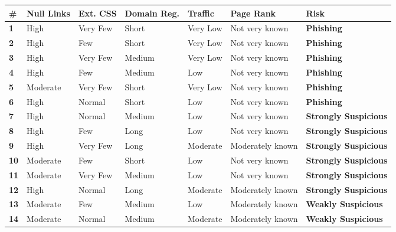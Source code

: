 \documentclass{article}
\begin{document}
\begin{table}[H]
\centering
\footnotesize
\setlength{\extrarowheight}{1pt}
\begin{tabularx}{\textwidth}{|>{\centering\arraybackslash}p{}|%
>{\raggedright\arraybackslash}p{}|%
>{\raggedright\arraybackslash}p{}|%
>{\raggedright\arraybackslash}p{}|%
>{\raggedright\arraybackslash}p{}|%
>{\raggedright\arraybackslash}p{}|%
>{\raggedright\arraybackslash}p{}|}
\hline
\rowcolor{gray!30}
\textbf{\#} & \textbf{Null Links} & \textbf{Ext. CSS} & \textbf{Domain Reg.} & \textbf{Traffic} & \textbf{Page Rank} & \textbf{Risk} \\ \hline
\textbf{1}  & High & Very Few & Short & Very Low & Not very known & \textbf{Phishing} \\ \hline
\textbf{2}  & High & Few & Short & Very Low & Not very known & \textbf{Phishing} \\ \hline
\textbf{3}  & High & Very Few & Medium & Very Low & Not very known & \textbf{Phishing} \\ \hline
\textbf{4}  & High & Few & Medium & Low & Not very known & \textbf{Phishing} \\ \hline
\textbf{5}  & Moderate & Very Few & Short & Very Low & Not very known & \textbf{Phishing} \\ \hline
\textbf{6}  & High & Normal & Short & Low & Not very known & \textbf{Phishing} \\ \hline
\textbf{7}  & High & Normal & Medium & Low & Not very known & \textbf{Strongly Suspicious} \\ \hline
\textbf{8}  & High & Few & Long & Low & Not very known & \textbf{Strongly Suspicious} \\ \hline
\textbf{9}  & High & Very Few & Long & Moderate & Moderately known & \textbf{Strongly Suspicious} \\ \hline
\textbf{10} & Moderate & Few & Short & Low & Not very known & \textbf{Strongly Suspicious} \\ \hline
\textbf{11} & Moderate & Very Few & Medium & Low & Not very known & \textbf{Strongly Suspicious} \\ \hline
\textbf{12} & High & Normal & Long & Moderate & Moderately known & \textbf{Strongly Suspicious} \\ \hline
\textbf{13} & Moderate & Few & Medium & Low & Moderately known & \textbf{Weakly Suspicious} \\ \hline
\textbf{14} & Moderate & Normal & Medium & Moderate & Moderately known & \textbf{Weakly Suspicious} \\ \hline

\end{tabularx}
\end{table}
\end{document}
